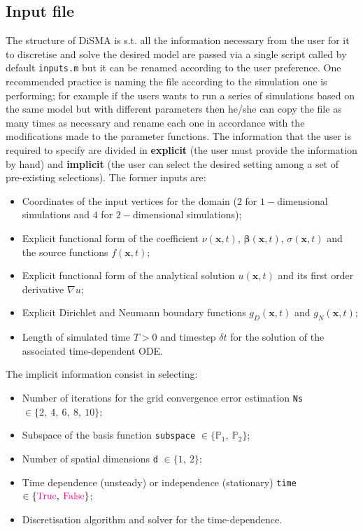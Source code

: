 \documentclass[12pt,openany,twoside,a4paper]{article}
\newcommand{\code}[1]{\colorbox{light-gray}{\texttt{#1}}}
\begin{document}
\subsection{Input file}
The structure of DiSMA is s.t. all the information necessary from the user for it to discretise and solve the desired model are passed via a single script called by default \code{inputs.m} but it can be renamed according to the user preference. One recommended practice is naming the file according to the simulation one is performing; for example if the users wants to run a series of simulations based on the same model but with different parameters then he/she can copy the file as many times as necessary and rename each one in accordance with the modifications made to the parameter functions.
\newline
The information that the user is required to specify are divided in \textbf{explicit} (the user must provide the information by hand) and \textbf{implicit} (the user can select the desired setting among a set of pre-existing selections). The former inputs are:
\begin{itemize}
    \item Coordinates of the input vertices for the domain ($2$ for $1-$dimensional simulations and $4$ for $2-$dimensional simulations);
    \item Explicit functional form of the coefficient $\nu(\mathbf{x},t)$, $\boldsymbol{\beta}(\mathbf{x},t)$, $\sigma(\mathbf{x},t)$ and the source functions $f(\mathbf{x},t)$;
    \item Explicit functional form of the analytical solution $u(\mathbf{x},t)$ and its first order derivative $\nabla u$;
    \item Explicit Dirichlet and Neumann boundary functions $g_D(\mathbf{x},t)$ and $g_N(\mathbf{x},t)$;
    \item Length of simulated time $T>0$ and timestep $\delta t$ for the solution of the associated time-dependent ODE. 
\end{itemize}
The implicit information consist in selecting:
\begin{itemize}
    \item Number of iterations for the grid convergence error estimation \code{Ns} $\in \{2,\:4,\:6,\:8,\:10\}$;
    \item Subspace of the basis function \code{subspace} $\in\{{\mathbb{P}_1,\:\mathbb{P}_2}\}$;
    \item Number of spatial dimensions \code{d} $\in\{{1,\:2}\}$;
    \item Time dependence (unsteady) or independence (stationary) \code{time} $\in\{\text{\textcolor{magenta}{True}},\:\text{\textcolor{magenta}{False}}\}$;
    \item Discretisation algorithm and solver for the time-dependence.
\end{itemize}
\end{document}
